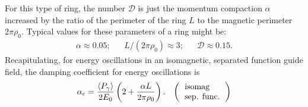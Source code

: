 \documentclass[../sands-adaptation.tex]{subfiles}
\begin{document}
For this type of ring, the number $\mathscr{D}$ is just the momentum compaction $\alpha$ increased by the ratio of the perimeter of the ring $L$ to the magnetic perimeter $2\pi\rho_0$. Typical values for these parameters of a ring might be:
\begin{align*}
	\alpha \approx 0.05; && L/(2\pi\rho_0)\approx 3; && \mathscr{D} \approx 0.15.
\end{align*}
Recapitulating, for energy oscillations in an isomagnetic, separated function guide field, the damping coefficient for energy oscillations is
\begin{align}
	\alpha_\epsilon = \dfrac{\mean{P_\gamma}}{2E_0}\left( 2 + \dfrac{\alpha L}{2 \pi \rho_0} \right). && \left(\begin{tabular}{l}
\text{isomag} \\
\text{sep. func.}
\end{tabular}\right)
\end{align}
\end{document}
